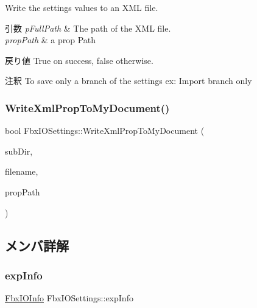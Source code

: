 Write the settings values to an X\+ML file. 
\begin{DoxyParams}{引数}
{\em p\+Full\+Path} & The path of the X\+ML file. \\
\hline
{\em prop\+Path} & a prop Path \\
\hline
\end{DoxyParams}
\begin{DoxyReturn}{戻り値}
{\ttfamily True} on success, {\ttfamily false} otherwise. 
\end{DoxyReturn}
\begin{DoxyRemark}{注釈}
To save only a branch of the settings ex\+: Import branch only 
\end{DoxyRemark}
\mbox{\label{class_fbx_i_o_settings_a7cdebdeff147dbdb99faaadc874e5d69}} 
\subsubsection{\texorpdfstring{Write\+Xml\+Prop\+To\+My\+Document()}{WriteXmlPropToMyDocument()}}
{\footnotesize\ttfamily bool Fbx\+I\+O\+Settings\+::\+Write\+Xml\+Prop\+To\+My\+Document (\begin{DoxyParamCaption}\item[{const \hyperlink{class_fbx_string}{Fbx\+String} \&}]{sub\+Dir,  }\item[{const \hyperlink{class_fbx_string}{Fbx\+String} \&}]{filename,  }\item[{const \hyperlink{class_fbx_string}{Fbx\+String} \&}]{prop\+Path }\end{DoxyParamCaption})}



\subsection{メンバ詳解}
\mbox{\label{class_fbx_i_o_settings_a138a9e01c4f15719b15710a0d9393623}} 
\subsubsection{\texorpdfstring{exp\+Info}{expInfo}}
{\footnotesize\ttfamily \hyperlink{class_fbx_i_o_info}{Fbx\+I\+O\+Info} Fbx\+I\+O\+Settings\+::exp\+Info}

